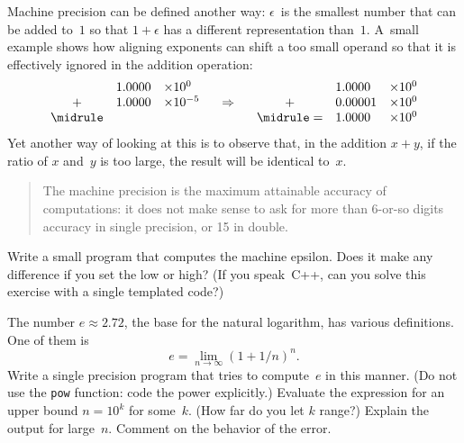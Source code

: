 Machine precision can be defined another way: $\epsilon$~is the
smallest number that can be added to~$1$ so that $1+\epsilon$ has a
different representation than~$1$. A~small example shows how aligning
exponents can shift a too small operand so that it is effectively ignored in
the addition operation:
\begin{equation}
\begin{array}{cll}
   &1.0000&\times 10^0\\
  +&1.0000&\times 10^{-5}\\ \midrule
\end{array}
\quad\Rightarrow\quad
\begin{array}{cll}
   &1.0000&\times 10^0\\
  +&0.00001&\times 10^0\\ \midrule
  =&1.0000&\times 10^0
\end{array}
\end{equation}
Yet another way of looking at this
is to observe that, in the addition $x+y$, if the ratio of $x$ and~$y$
is too large, the result will be identical to~$x$.

\newenvironment{takeaway}{\begin{quote}}{\end{quote}}

\begin{takeaway}
The machine precision is the maximum attainable accuracy of
computations: it does not make sense to ask for more than 6-or-so
digits accuracy in single precision, or 15 in double.
\end{takeaway}

\begin{exercise}
  \label{ex:epsilon}%
  Write a small program that computes the machine epsilon. Does it
  make any difference if you set the
   low or high? 
    (If you speak~C++, can you solve this exercise with a single
    templated code?)
\end{exercise}

\begin{exercise}
  \label{ex:e-compute}
  The number $e\approx 2.72$, the base for the natural logarithm, has
  various definitions. One of them is 
  \begin{equation}
    e=\lim_{n\rightarrow\infty} (1+1/n)^n.
  \end{equation}
  Write a single precision program that tries to compute~$e$ in this
  manner. (Do not use the \texttt{pow} function: code the power explicitly.)
  Evaluate the expression for an upper bound $n=10^k$ for some~$k$.
  (How far do you let $k$ range?)
  Explain the output for large~$n$. Comment on the
  behavior of the error.
\end{exercise}

